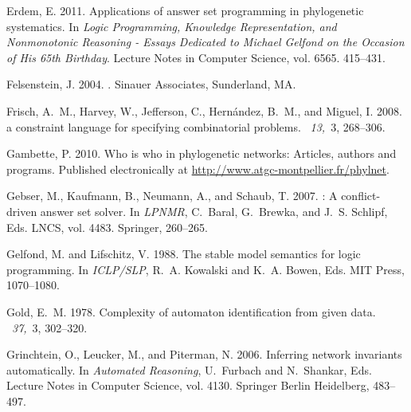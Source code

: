 \documentclass{tlp}
\renewcommand{\|}{\ensuremath{\,|\,}}
\renewcommand{\|}{\,|\,}
\begin{document}
\begin{thebibliography}{}
{\sc Erdem, E.} 2011.
\newblock Applications of answer set programming in phylogenetic systematics.
\newblock In {\em Logic Programming, Knowledge Representation, and Nonmonotonic
  Reasoning - Essays Dedicated to Michael Gelfond on the Occasion of His 65th
  Birthday}. Lecture Notes in Computer Science, vol. 6565. 415--431.

{\sc Felsenstein, J.} 2004.
.
\newblock Sinauer Associates, Sunderland, MA.

{\sc Frisch, A.~M.}, {\sc Harvey, W.}, {\sc Jefferson, C.}, {\sc Hern{\'a}ndez,
  B.~M.}, {\sc and} {\sc Miguel, I.} 2008.
 a constraint language for specifying combinatorial
  problems.
~{\em 13,\/}~3, 268--306.

{\sc Gambette, P.} 2010.
\newblock Who is who in phylogenetic networks: Articles, authors and programs.
\newblock Published electronically at
  \url{http://www.atgc-montpellier.fr/phylnet}.

{\sc Gebser, M.}, {\sc Kaufmann, B.}, {\sc Neumann, A.}, {\sc and} {\sc Schaub,
  T.} 2007.
: A conflict-driven answer set solver.
\newblock In {\em LPNMR}, {C.~Baral}, {G.~Brewka}, {and} {J.~S. Schlipf}, Eds.
  LNCS, vol. 4483. Springer, 260--265.

{\sc Gelfond, M.} {\sc and} {\sc Lifschitz, V.} 1988.
\newblock The stable model semantics for logic programming.
\newblock In {\em ICLP/SLP}, {R.~A. Kowalski} {and} {K.~A. Bowen}, Eds. MIT
  Press, 1070--1080.

{\sc Gold, E.~M.} 1978.
\newblock Complexity of automaton identification from given data.
~{\em 37,\/}~3, 302--320.

{\sc Grinchtein, O.}, {\sc Leucker, M.}, {\sc and} {\sc Piterman, N.} 2006.
\newblock Inferring network invariants automatically.
\newblock In {\em Automated Reasoning}, {U.~Furbach} {and} {N.~Shankar}, Eds.
  Lecture Notes in Computer Science, vol. 4130. Springer Berlin Heidelberg,
  483--497.


\end{thebibliography}
\end{document}
